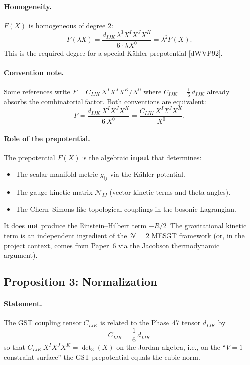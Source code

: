 \paragraph{Homogeneity.}
$F(X)$ is homogeneous of degree 2:
\[
  F(\lambda X) = \frac{d_{IJK}\, \lambda^3 X^I X^J X^K}{6 \cdot
  \lambda X^0} = \lambda^2 F(X).
\]
This is the required degree for a special K\"ahler prepotential
[dWVP92].

\paragraph{Convention note.}
Some references write $F = C_{IJK}\, X^I X^J X^K / X^0$ where
$C_{IJK} = \tfrac{1}{6}\, d_{IJK}$ already absorbs the combinatorial
factor. Both conventions are equivalent:
\[
  F = \frac{d_{IJK}\, X^I X^J X^K}{6\, X^0}
    = \frac{C_{IJK}\, X^I X^J X^K}{X^0}.
\]

\paragraph{Role of the prepotential.}
The prepotential $F(X)$ is the algebraic \textbf{input} that determines:
\begin{itemize}
\item The scalar manifold metric $g_{i\bar{j}}$ via the K\"ahler potential.
\item The gauge kinetic matrix $\mathcal{N}_{IJ}$ (vector kinetic terms
  and theta angles).
\item The Chern--Simons-like topological couplings in the bosonic
  Lagrangian.
\end{itemize}
It does \textbf{not} produce the Einstein--Hilbert term $-R/2$.
The gravitational kinetic term is an independent ingredient of the
$\mathcal{N} = 2$ MESGT framework (or, in the project context, comes from
Paper~6 via the Jacobson thermodynamic argument).


\subsection*{Proposition 3: Normalization}

\paragraph{Statement.}
The GST coupling tensor $C_{IJK}$ is related to the Phase~47 tensor
$d_{IJK}$ by
\begin{equation}\tag{49.3}
  C_{IJK} = \frac{1}{6}\, d_{IJK}
\end{equation}
so that $C_{IJK}\, X^I X^J X^K = \det_3(X)$ on the Jordan algebra,
i.e., on the ``$V = 1$ constraint surface'' the GST prepotential
equals the cubic norm.

